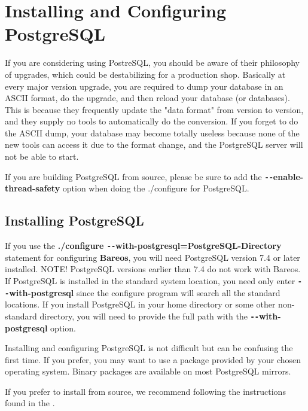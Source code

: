 
\chapter{Installing and Configuring PostgreSQL}
\label{PostgreSqlChapter}

If you are considering using PostreSQL, you should be aware
of their philosophy of upgrades, which could be
destabilizing for a production shop.  Basically at every major version
upgrade, you are required to dump your database in an ASCII format,
do the upgrade, and then reload your database (or databases). This is
because they frequently update the "data format" from version to
version, and they supply no tools to automatically do the conversion.
If you forget to do the ASCII dump, your database may become totally
useless because none of the new tools can access it due to the format
change, and the PostgreSQL server will not be able to start.

If you are building PostgreSQL from source, please be sure to add
the {\bf \verb:--:enable-thread-safety} option when doing the ./configure
for PostgreSQL.

\section{Installing PostgreSQL}

If you use the {\bf ./configure \verb:--:with-postgresql=PostgreSQL-Directory}
statement for configuring {\bf Bareos}, you will need PostgreSQL version 7.4
or later installed. NOTE! PostgreSQL versions earlier than 7.4 do not work
with Bareos. If PostgreSQL is installed in the standard system location, you
need only enter {\bf \verb:--:with-postgresql} since the configure program will
search all the standard locations. If you install PostgreSQL in your home
directory or some other non-standard directory, you will need to provide the
full path with the {\bf \verb:--:with-postgresql} option.

Installing and configuring PostgreSQL is not difficult but can be confusing
the first time. If you prefer, you may want to use a package provided by your
chosen operating system. Binary packages are available on most PostgreSQL
mirrors.

If you prefer to install from source, we recommend following the instructions
found in the
.

